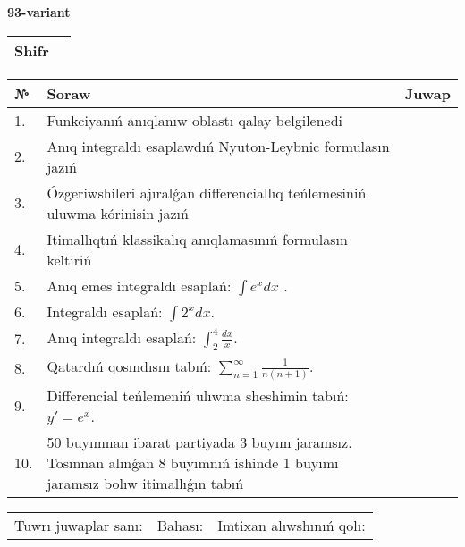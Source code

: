 \documentclass{article}
\begin{document}
  \egroup
  
  \newpage
  
  
  \textbf{93-variant}\\
  
  \bgroup
  \def\arraystretch{1.6} %
  
  \begin{tabular}{|m{5.7cm}|m{9.5cm}|}
  \hline
  Shifr & \\
  \hline
  \end{tabular}
  
  \vspace{1cm}
  
  \begin{tabular}{|m{0.7cm}|m{10cm}|m{4cm}|}
  \hline
  № & Soraw & Juwap \\
  \hline
  1. & Funkciyanıń anıqlanıw oblastı qalay belgilenedi &  \\
  \hline
  2. & Anıq integraldı esaplawdıń Nyuton-Leybnic formulasın jazıń &  \\
  \hline
  3. & Ózgeriwshileri ajıralǵan differenciallıq teńlemesiniń uluwma kórinisin jazıń &  \\
  \hline
  4. & Itimallıqtıń klassikalıq anıqlamasınıń formulasın keltiriń &  \\
  \hline
  5. & Anıq emes integraldı esaplań: \(\int{e^{x}dx}\) . &  \\
  \hline
  6. & Integraldı esaplań: \(\int{2^{x}dx}\). &  \\
  \hline
  7. & Anıq integraldı esaplań: \(\int_{2}^{4}\frac{dx}{x}\). &  \\
  \hline
  8. & Qatardıń qosındısın tabıń: \(\sum_{n = 1}^{\infty}\frac{1}{n(n + 1)}\). &  \\
  \hline
  9. & Differencial teńlemeniń ulıwma sheshimin tabıń: \(y' = e^{x}\). &  \\
  \hline
  10. & 50 buyımnan ibarat partiyada 3 buyım jaramsız. Tosınnan alınǵan 8 buyımnıń ishinde 1 buyımı jaramsız bolıw itimallıǵın tabıń &  \\
  \hline
  \end{tabular}
  
  \vspace{1cm}
  
  \begin{tabular}{lll}
  Tuwrı juwaplar sanı: \underline{\hspace{1.5cm}} & 
  Bahası: \underline{\hspace{1.5cm}} & 
  Imtixan alıwshınıń qolı: \underline{\hspace{2cm}} \\
  \end{tabular}
  
\end{document}
